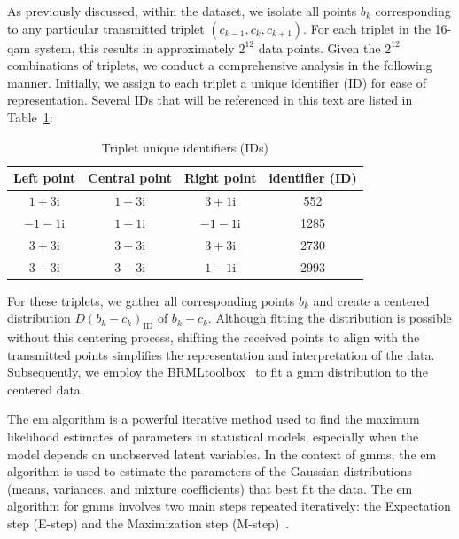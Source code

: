 As previously discussed, within the dataset, we isolate all points \( b_k \) corresponding to any particular transmitted triplet \( (c_{k-1}, c_k, c_{k+1}) \). For each triplet in the 16-\Gls{qam} system, this results in approximately \( 2^{12} \) data points. Given the \( 2^{12} \) combinations of triplets, we conduct a comprehensive analysis in the following manner. Initially, we assign to each triplet a unique identifier (ID) for ease of representation. Several IDs that will be referenced in this text are listed in Table~\ref{tab:triplet_ids}:
\begin{table}[h]
    \caption{Triplet unique identifiers (IDs)}
    \begin{center}
        \begin{tabular}{cccc}
            \hline
            Left point & Central point & Right point & identifier (ID)\\ 
            \hline
            $1+3\mathrm{i}$ & $1+3\mathrm{i}$ & $3+1\mathrm{i}$ & 552 \\ %
            $-1-1\mathrm{i}$ & $1+1\mathrm{i}$ & $-1-1\mathrm{i}$ & 1285 \\ %
            $3+3\mathrm{i}$ & $3+3\mathrm{i}$ & $3+3\mathrm{i}$ & 2730 \\ %
            $3-3\mathrm{i}$ & $3-3\mathrm{i}$ & $1-1\mathrm{i}$ & 2993 \\ %
            \hline
        \end{tabular}
    \label{tab:triplet_ids}
    \end{center}
\end{table} %
For these triplets, we gather all corresponding points \( b_k \) and create a centered distribution $D(b_{k} - c_k)_{\mathrm{ID}}$ of \( b_k - c_k \). Although fitting the distribution is possible without this centering process, shifting the received points to align with the transmitted points simplifies the representation and interpretation of the data. Subsequently, we employ the BRMLtoolbox~\cite{barberBRML2012} to fit a \gls{gmm} distribution to the centered data. 


The \acrfull{em} algorithm is a powerful iterative method used to find the maximum likelihood estimates of parameters in statistical models, especially when the model depends on unobserved latent variables. In the context of \acrshort{gmm}s, the \acrshort{em} algorithm is used to estimate the parameters of the Gaussian distributions (means, variances, and mixture coefficients) that best fit the data.
The \acrshort{em} algorithm for \acrshort{gmm}s involves two main steps repeated iteratively: the Expectation step (E-step) and the Maximization step (M-step)~\cite{hastie2009elements,murphy2012machine}.

